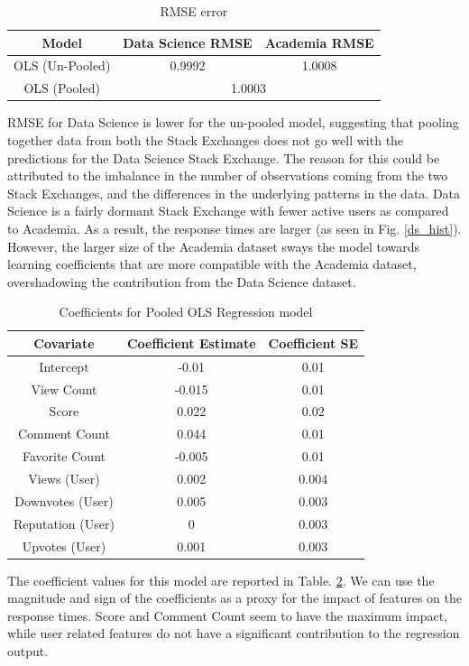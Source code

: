 \documentclass[12pt]{article}
\begin{document}
\begin{table}[ht]
  \centering
  \begin{tabular}{|c|c|c|}\hline
    Model & Data Science RMSE & Academia RMSE   \\ \hline
    OLS (Un-Pooled) & 0.9992 & 1.0008 \\ \hline
    OLS (Pooled) & \multicolumn{2}{c|}{1.0003} \\ \hline
  \end{tabular}
  \caption{RMSE error}
  \label{table:ols-rmse}
\end{table}

RMSE for Data Science is lower for the un-pooled model, suggesting that pooling together data from both the Stack Exchanges does not go well with the predictions for the Data Science Stack Exchange. The reason for this could be attributed to the imbalance in the number of observations coming from the two Stack Exchanges, and the differences in the underlying patterns in the data. Data Science is a fairly dormant Stack Exchange with fewer active users as compared to Academia. As a result, the response times are larger (as seen in Fig. \ref{ds_hist}). However, the larger size of the Academia dataset sways the model towards learning coefficients that are more compatible with the Academia dataset, overshadowing the contribution from the Data Science dataset.

\begin{table}[ht]
  \centering
  \begin{tabular}{|c|c|c|}\hline
    Covariate & Coefficient Estimate & Coefficient SE \\ \hline
    Intercept & -0.01 & 0.01\\
    View Count & -0.015 & 0.01 \\
    Score & 0.022 & 0.02 \\
    Comment Count & 0.044 & 0.01 \\
    Favorite Count & -0.005 & 0.01 \\
    Views (User) & 0.002 & 0.004 \\
    Downvotes (User) & 0.005 & 0.003 \\
    Reputation (User) & 0 & 0.003 \\
    Upvotes (User) & 0.001 & 0.003 \\ \hline
  \end{tabular}
  \caption{Coefficients for Pooled OLS Regression model}
  \label{table:ols-coeff}
\end{table}

The coefficient values for this model are reported in Table. \ref{table:ols-coeff}. We can use the magnitude and sign of the coefficients as a proxy for the impact of features on the response times. Score and Comment Count seem to have the maximum impact, while user related features do not have a significant contribution to the regression output.
\end{document}
